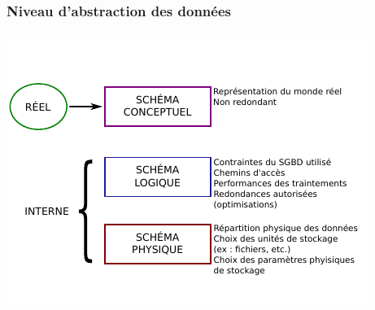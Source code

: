 \begin{frame}
  \frametitle{Niveau d'abstraction des données}
  \begin{center}
    \includegraphics[width=\linewidth]{abstractions.pdf}
  \end{center}
\end{frame}


